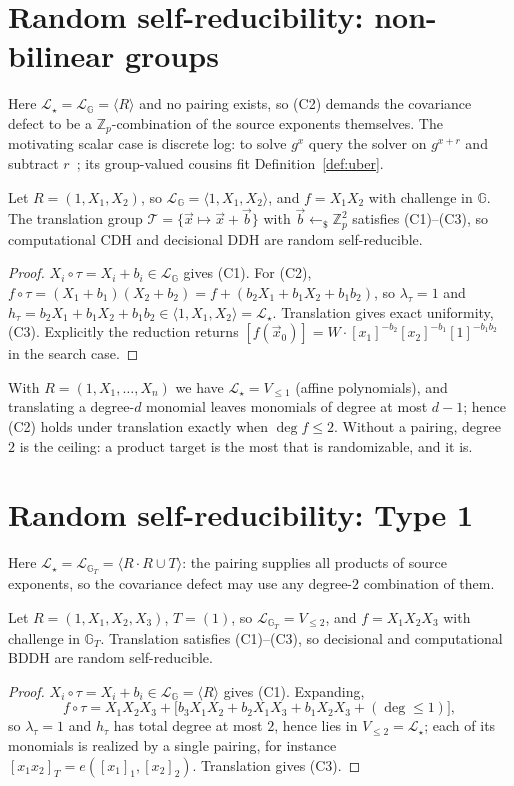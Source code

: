 \documentclass{aicr-solution}
\newcommand{\G}{\mathbb{G}}
\newcommand{\GT}{\mathbb{G}_T}
\newcommand{\Zp}{\mathbb{Z}_p}
\newcommand{\vx}{\vec{x}}
\newcommand{\vb}{\vec{b}}
\newcommand{\LL}{\mathcal{L}}
\newcommand{\Span}[1]{\langle #1 \rangle} %
\newcommand{\rsample}{\leftarrow_{\$}}
\begin{document}
\section{Random self-reducibility: non-bilinear groups}
\label{sec:nonbilinear}

Here $\LL_\star=\LL_{\G}=\Span{R}$ and no pairing exists, so (C2) demands the covariance
defect to be a $\Zp$-combination of the source exponents themselves. The motivating
scalar case is discrete log: to solve $g^{x}$ query the solver on $g^{x+r}$ and subtract
$r$~\cite{TW87}; its group-valued cousins fit Definition~\ref{def:uber}.

\begin{proposition}
\label{prop:cdh}
Let $R=(1,X_1,X_2)$, so $\LL_{\G}=\Span{1,X_1,X_2}$, and $f=X_1X_2$ with challenge in $\G$.
The translation group $\mathcal T=\{\vx\mapsto\vx+\vb\}$ with $\vb\rsample\Zp^{2}$ satisfies
\textup{(C1)--(C3)}, so computational CDH and decisional DDH are random self-reducible.
\end{proposition}
\begin{proof}
$X_i\circ\tau=X_i+b_i\in\LL_{\G}$ gives (C1). For (C2),
$f\circ\tau=(X_1+b_1)(X_2+b_2)=f+(b_2X_1+b_1X_2+b_1b_2)$, so $\lambda_\tau=1$ and
$h_\tau=b_2X_1+b_1X_2+b_1b_2\in\Span{1,X_1,X_2}=\LL_\star$. Translation gives exact
uniformity, (C3). Explicitly the reduction returns
$[f(\vx_0)]=W\cdot[x_1]^{-b_2}[x_2]^{-b_1}[1]^{-b_1b_2}$ in the search case.
\end{proof}

With $R=(1,X_1,\dots,X_n)$ we have $\LL_\star=V_{\le 1}$ (affine polynomials), and
translating a degree-$d$ monomial leaves monomials of degree at most $d-1$; hence (C2)
holds under translation exactly when $\deg f\le 2$. Without a pairing, degree $2$ is the
ceiling: a product target is the most that is randomizable, and it is.

\section{Random self-reducibility: Type 1}

Here $\LL_\star=\LL_{\GT}=\Span{R\cdot R\cup T}$: the pairing supplies all products of source
exponents, so the covariance defect may use any degree-$2$ combination of them.

\begin{proposition}[BDDH]
\label{prop:bddh}
Let $R=(1,X_1,X_2,X_3)$, $T=(1)$, so $\LL_{\GT}=V_{\le 2}$, and $f=X_1X_2X_3$ with challenge
in $\GT$. Translation satisfies \textup{(C1)--(C3)}, so decisional and computational BDDH are
random self-reducible.
\end{proposition}
\begin{proof}
$X_i\circ\tau=X_i+b_i\in\LL_{\G}=\Span{R}$ gives (C1). Expanding,
\[
  f\circ\tau=X_1X_2X_3+\bigl[b_3X_1X_2+b_2X_1X_3+b_1X_2X_3+(\deg\le 1)\bigr],
\]
so $\lambda_\tau=1$ and $h_\tau$ has total degree at most $2$, hence lies in
$V_{\le 2}=\LL_\star$; each of its monomials is realized by a single pairing, for instance
$[x_1x_2]_T=e([x_1]_1,[x_2]_2)$. Translation gives (C3).
\end{proof}
\end{document}
